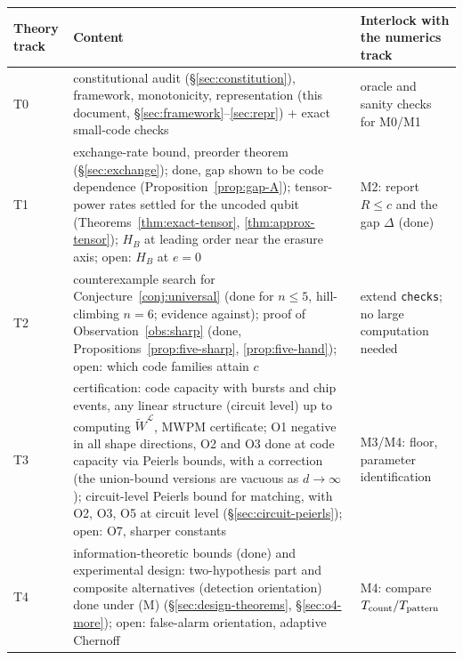 \begin{center}
\begin{tabular}{p{1.3cm}p{6.8cm}p{6.2cm}}
\toprule
Theory track & Content & Interlock with the numerics track \\
\midrule
T0 & constitutional audit (\S\ref{sec:constitution}), framework, monotonicity, representation (this document, \S\ref{sec:framework}--\ref{sec:repr}) + exact small-code checks & oracle and sanity checks for M0/M1 \\
T1 & exchange-rate bound, preorder theorem (\S\ref{sec:exchange}); done, gap shown to be code dependence (Proposition~\ref{prop:gap-A}); tensor-power rates settled for the uncoded qubit (Theorems~\ref{thm:exact-tensor}, \ref{thm:approx-tensor}); $H_B$ at leading order near the erasure axis; open: $H_B$ at $e=0$ & M2: report $R\le c$ and the gap $\Delta$ (done) \\
T2 & counterexample search for Conjecture~\ref{conj:universal} (done for $n\le5$, hill-climbing $n=6$; evidence against); proof of Observation~\ref{obs:sharp} (done, Propositions~\ref{prop:five-sharp}, \ref{prop:five-hand}); open: which code families attain $c$ & extend \texttt{checks}; no large computation needed \\
T3 & certification: code capacity with bursts and chip events, any linear structure (circuit level) up to computing $\widetilde W^{\mathcal L}$, MWPM certificate; O1 negative in all shape directions, O2 and O3 done at code capacity via Peierls bounds, with a correction (the union-bound versions are vacuous as $d\to\infty$); circuit-level Peierls bound for matching, with O2, O3, O5 at circuit level (\S\ref{sec:circuit-peierls}); open: O7, sharper constants & M3/M4: floor, parameter identification \\
T4 & information-theoretic bounds (done) and experimental design: two-hypothesis part and composite alternatives (detection orientation) done under (M) (\S\ref{sec:design-theorems}, \S\ref{sec:o4-more}); open: false-alarm orientation, adaptive Chernoff & M4: compare $T_{\rm count}/T_{\rm pattern}$ \\
\bottomrule
\end{tabular}
\end{center}
